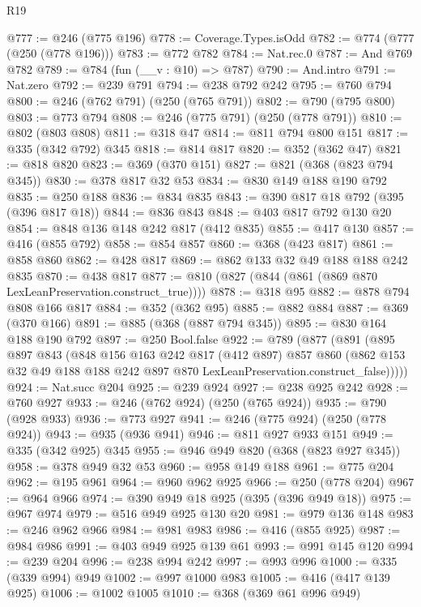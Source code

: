 \begin{lexlean}{R19}
\begin{coremodule}
{{{{{{{{{{{{{{@777 := @246 (@775 @196)
@778 := Coverage.Types.isOdd
@782 := @774 (@777 (@250 (@778 @196)))
@783 := @772 @782
@784 := Nat.rec.{0}
@787 := And @769 @782
@789 := @784 (fun (__v : @10) => @787)
@790 := And.intro
@791 := Nat.zero
@792 := @239 @791
@794 := @238 @792 @242
@795 := @760 @794
@800 := @246 (@762 @791) (@250 (@765 @791))
@802 := @790 (@795 @800)
@803 := @773 @794
@808 := @246 (@775 @791) (@250 (@778 @791))
@810 := @802 (@803 @808)
@811 := @318 @47
@814 := @811 @794 @800 @151
@817 := @335 (@342 @792) @345
@818 := @814 @817
@820 := @352 (@362 @47)
@821 := @818 @820
@823 := @369 (@370 @151)
@827 := @821 (@368 (@823 @794 @345))
@830 := @378 @817 @32 @53
@834 := @830 @149 @188 @190 @792
@835 := @250 @188
@836 := @834 @835
@843 := @390 @817 @18 @792 (@395 (@396 @817 @18))
@844 := @836 @843
@848 := @403 @817 @792 @130 @20
@854 := @848 @136 @148 @242 @817 (@412 @835)
@855 := @417 @130
@857 := @416 (@855 @792)
@858 := @854 @857
@860 := @368 (@423 @817)
@861 := @858 @860
@862 := @428 @817
@869 := @862 @133 @32 @49 @188 @188 @242 @835
@870 := @438 @817
@877 := @810 (@827 (@844 (@861 (@869 @870 LexLeanPreservation.construct_true))))
@878 := @318 @95
@882 := @878 @794 @808 @166 @817
@884 := @352 (@362 @95)
@885 := @882 @884
@887 := @369 (@370 @166)
@891 := @885 (@368 (@887 @794 @345))
@895 := @830 @164 @188 @190 @792
@897 := @250 Bool.false
@922 := @789
    (@877
      (@891
        (@895
          @897
          @843
          (@848
            @156
            @163
            @242
            @817
            (@412 @897)
            @857
            @860
            (@862 @153 @32 @49 @188 @188 @242 @897 @870 LexLeanPreservation.construct_false)))))
@924 := Nat.succ @204
@925 := @239 @924
@927 := @238 @925 @242
@928 := @760 @927
@933 := @246 (@762 @924) (@250 (@765 @924))
@935 := @790 (@928 @933)
@936 := @773 @927
@941 := @246 (@775 @924) (@250 (@778 @924))
@943 := @935 (@936 @941)
@946 := @811 @927 @933 @151
@949 := @335 (@342 @925) @345
@955 := @946 @949 @820 (@368 (@823 @927 @345))
@958 := @378 @949 @32 @53
@960 := @958 @149 @188
@961 := @775 @204
@962 := @195 @961
@964 := @960 @962 @925
@966 := @250 (@778 @204)
@967 := @964 @966
@974 := @390 @949 @18 @925 (@395 (@396 @949 @18))
@975 := @967 @974
@979 := @516 @949 @925 @130 @20
@981 := @979 @136 @148
@983 := @246 @962 @966
@984 := @981 @983
@986 := @416 (@855 @925)
@987 := @984 @986
@991 := @403 @949 @925 @139 @61
@993 := @991 @145 @120
@994 := @239 @204
@996 := @238 @994 @242
@997 := @993 @996
@1000 := @335 (@339 @994) @949
@1002 := @997 @1000 @983
@1005 := @416 (@417 @139 @925)
@1006 := @1002 @1005
@1010 := @368 (@369 @61 @996 @949)
}}}}}}}}}}}}}}
\end{coremodule}
\end{lexlean}
